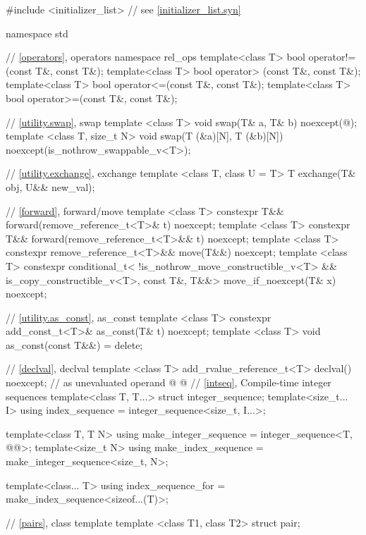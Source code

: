 \begin{codeblock}
#include <initializer_list>     // see \ref{initializer_list.syn}

namespace std {
  // \ref{operators}, operators
  namespace rel_ops {
    template<class T> bool operator!=(const T&, const T&);
    template<class T> bool operator> (const T&, const T&);
    template<class T> bool operator<=(const T&, const T&);
    template<class T> bool operator>=(const T&, const T&);
  }

  // \ref{utility.swap}, swap
  template <class T>
    void swap(T& a, T& b) noexcept(@\seebelow@);
  template <class T, size_t N>
    void swap(T (&a)[N], T (&b)[N]) noexcept(is_nothrow_swappable_v<T>);

  // \ref{utility.exchange}, exchange
  template <class T, class U = T>
    T exchange(T& obj, U&& new_val);

  // \ref{forward}, forward/move
  template <class T>
    constexpr T&& forward(remove_reference_t<T>& t) noexcept;
  template <class T>
    constexpr T&& forward(remove_reference_t<T>&& t) noexcept;
  template <class T>
    constexpr remove_reference_t<T>&& move(T&&) noexcept;
  template <class T>
    constexpr conditional_t<
        !is_nothrow_move_constructible_v<T> && is_copy_constructible_v<T>, const T&, T&&>
      move_if_noexcept(T& x) noexcept;

  // \ref{utility.as_const}, as_const
  template <class T>
    constexpr add_const_t<T>& as_const(T& t) noexcept;
  template <class T>
    void as_const(const T&&) = delete;

  // \ref{declval}, declval
  template <class T>
    add_rvalue_reference_t<T> declval() noexcept;  // as unevaluated operand
@%
%
%
%
@
  // \ref{intseq}, Compile-time integer sequences
  template<class T, T...>
    struct integer_sequence;
  template<size_t... I>
    using index_sequence = integer_sequence<size_t, I...>;

  template<class T, T N>
    using make_integer_sequence = integer_sequence<T, @\seebelow{}@>;
  template<size_t N>
    using make_index_sequence = make_integer_sequence<size_t, N>;

  template<class... T>
    using index_sequence_for = make_index_sequence<sizeof...(T)>;

  // \ref{pairs}, class template 
  template <class T1, class T2>
    struct pair;

}
\end{codeblock}

